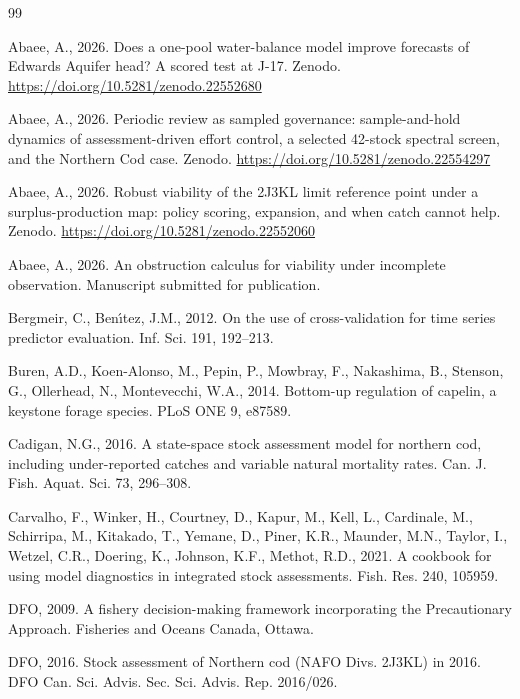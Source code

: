 \documentclass[preprint,11pt,authoryear]{elsarticle}
\theoremstyle{definition}
\theoremstyle{remark}
\begin{document}
\begin{thebibliography}{99}
\providecommand{\natexlab}[1]{#1}

Abaee, A., 2026. Does a one-pool water-balance model improve forecasts of Edwards Aquifer head? A scored test at J-17. Zenodo. \url{https://doi.org/10.5281/zenodo.22552680}

Abaee, A., 2026. Periodic review as sampled governance: sample-and-hold dynamics of assessment-driven effort control, a selected 42-stock spectral screen, and the Northern Cod case. Zenodo. \url{https://doi.org/10.5281/zenodo.22554297}

Abaee, A., 2026. Robust viability of the 2J3KL limit reference point under a surplus-production map: policy scoring, expansion, and when catch cannot help. Zenodo. \url{https://doi.org/10.5281/zenodo.22552060}

Abaee, A., 2026. An obstruction calculus for viability under incomplete observation. Manuscript submitted for publication.

Bergmeir, C., Ben{\'\i}tez, J.M., 2012. On the use of cross-validation for time series predictor evaluation. Inf. Sci. 191, 192--213.

Buren, A.D., Koen-Alonso, M., Pepin, P., Mowbray, F., Nakashima, B., Stenson, G., Ollerhead, N., Montevecchi, W.A., 2014. Bottom-up regulation of capelin, a keystone forage species. PLoS ONE 9, e87589.

Cadigan, N.G., 2016. A state-space stock assessment model for northern cod, including under-reported catches and variable natural mortality rates. Can. J. Fish. Aquat. Sci. 73, 296--308.

Carvalho, F., Winker, H., Courtney, D., Kapur, M., Kell, L., Cardinale, M., Schirripa, M., Kitakado, T., Yemane, D., Piner, K.R., Maunder, M.N., Taylor, I., Wetzel, C.R., Doering, K., Johnson, K.F., Methot, R.D., 2021. A cookbook for using model diagnostics in integrated stock assessments. Fish. Res. 240, 105959.

DFO, 2009. A fishery decision-making framework incorporating the Precautionary Approach. Fisheries and Oceans Canada, Ottawa.

DFO, 2016. Stock assessment of Northern cod (NAFO Divs. 2J3KL) in 2016. DFO Can. Sci. Advis. Sec. Sci. Advis. Rep. 2016/026.


\end{thebibliography}
\end{document}
